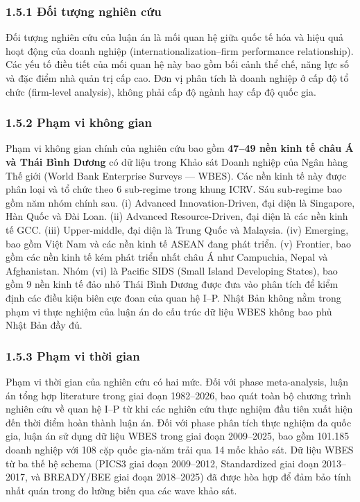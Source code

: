 \documentclass[12pt,a4paper]{article}
\begin{document}
\hypertarget{151-ux111ux1ed1i-tux1b0ux1ee3ng-nghiuxean-cux1ee9u}{%
\subsubsection{1.5.1 Đối tượng nghiên
cứu}\label{151-ux111ux1ed1i-tux1b0ux1ee3ng-nghiuxean-cux1ee9u}}

Đối tượng nghiên cứu của luận án là mối quan hệ giữa quốc tế hóa và hiệu
quả hoạt động của doanh nghiệp (internationalization--firm performance
relationship). Các yếu tố điều tiết của mối quan hệ này bao gồm bối cảnh
thể chế, năng lực số và đặc điểm nhà quản trị cấp cao. Đơn vị phân tích
là doanh nghiệp ở cấp độ tổ chức (firm-level analysis), không phải cấp
độ ngành hay cấp độ quốc gia.

\hypertarget{152-phux1ea1m-vi-khuxf4ng-gian}{%
\subsubsection{1.5.2 Phạm vi không
gian}\label{152-phux1ea1m-vi-khuxf4ng-gian}}

Phạm vi không gian chính của nghiên cứu bao gồm \textbf{47--49 nền kinh
tế châu Á và Thái Bình Dương} có dữ liệu trong Khảo sát Doanh nghiệp của
Ngân hàng Thế giới (World Bank Enterprise Surveys --- WBES). Các nền
kinh tế này được phân loại và tổ chức theo 6 sub-regime trong khung
ICRV. Sáu sub-regime bao gồm năm nhóm chính sau. (i) Advanced
Innovation-Driven, đại diện là Singapore, Hàn Quốc và Đài Loan. (ii)
Advanced Resource-Driven, đại diện là các nền kinh tế GCC. (iii)
Upper-middle, đại diện là Trung Quốc và Malaysia. (iv) Emerging, bao gồm
Việt Nam và các nền kinh tế ASEAN đang phát triển. (v) Frontier, bao gồm
các nền kinh tế kém phát triển nhất châu Á như Campuchia, Nepal và
Afghanistan. Nhóm (vi) là Pacific SIDS (Small Island Developing States),
bao gồm 9 nền kinh tế đảo nhỏ Thái Bình Dương được đưa vào phân tích để
kiểm định các điều kiện biên cực đoan của quan hệ I--P. Nhật Bản không
nằm trong phạm vi thực nghiệm của luận án do cấu trúc dữ liệu WBES không
bao phủ Nhật Bản đầy đủ.

\hypertarget{153-phux1ea1m-vi-thux1eddi-gian}{%
\subsubsection{1.5.3 Phạm vi thời
gian}\label{153-phux1ea1m-vi-thux1eddi-gian}}

Phạm vi thời gian của nghiên cứu có hai mức. Đối với phase
meta-analysis, luận án tổng hợp literature trong giai đoạn 1982--2026,
bao quát toàn bộ chương trình nghiên cứu về quan hệ I--P từ khi các
nghiên cứu thực nghiệm đầu tiên xuất hiện đến thời điểm hoàn thành luận
án. Đối với phase phân tích thực nghiệm đa quốc gia, luận án sử dụng dữ
liệu WBES trong giai đoạn 2009--2025, bao gồm 101.185 doanh nghiệp với
108 cặp quốc gia-năm trải qua 14 mốc khảo sát. Dữ liệu WBES từ ba thế hệ
schema (PICS3 giai đoạn 2009--2012, Standardized giai đoạn 2013--2017,
và BREADY/BEE giai đoạn 2018--2025) đã được hòa hợp để đảm bảo tính nhất
quán trong đo lường biến qua các wave khảo sát.
\end{document}
